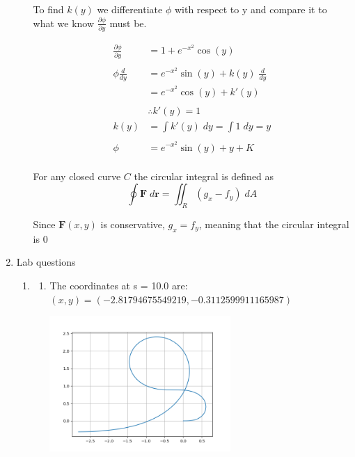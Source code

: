 \documentclass[a4paper,11pt]{article}
\begin{document}
\begin{preview}
\begin{enumerate}
\begin{enumerate}
    To find $k(y)$ we differentiate $\phi$ with respect to y and compare it to what we know $\frac{\partial \phi}{\partial y}$ must be.

    \begin{align*}
        \frac{\partial \phi}{\partial y} &= 1+e^{-x^2}\cos(y)\\\\
        \phi \frac{d}{dy} &= e^{-x^2}\sin(y) +k(y) \; \frac{d}{dy}\\
        &= e^{-x^2}\cos(y) +k'(y)\\\\
        &\therefore k'(y) = 1\\
        k(y) &= \int k'(y) \; dy = \int 1 \; dy = y\\\\
        \phi &= e^{-x^2}\sin(y) + y + K\\
    \end{align*}

    For any closed curve $C$ the circular integral is defined as 
    $$ \oint \textbf{F} \;d \textbf{r} = \iint_R (g_x - f_y) \; dA $$

    Since $\textbf{F}(x,y)$ is conservative, $g_x = f_y$, meaning that the circular integral is $0$

\end{enumerate}

\item Lab questions

\begin{enumerate}
    \item
\begin{enumerate}
    \item The coordinates at s = 10.0 are: \\$(x,y) = (-2.81794675549219,-0.3112599911165987)$
    
    \begin{center}
        \includegraphics[width = 0.6\textwidth]{Figure_1.png}
    \end{center}


\end{enumerate}
\end{enumerate}
\end{enumerate}
\end{preview}
\end{document}
